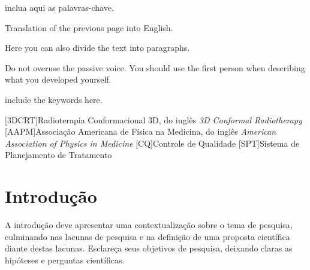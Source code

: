 \documentclass[a4paper, 12pt]{ppgeb}
\begin{document}
inclua aqui as palavras-chave.
\acresetall %
\clearpage
\restoregeometry
\acresetall %
\vspace{24pt}

Translation of the previous page into English.

Here you can also divide the text into paragraphs.

Do not overuse the passive voice. You should use the first person when describing what you developed yourself.

\vspace{14pt}

include the keywords here.
\acresetall %

\indice

\begin{center}

{\bfseries{} }%
\end{center}

[3DCRT]{Radioterapia Conformacional 3D, do inglês \emph{3D Conformal Radiotherapy}}
[AAPM]{Associação Americana de Física na Medicina, do inglês \emph{American Association of Physics in Medicine}}
[CQ]{Controle de Qualidade}
[SPT]{Sistema de Planejamento de Tratamento}

\begin{acronym}
\end{acronym}

\clearpage


\acresetall %

\chapter{Introdução}

A introdução deve apresentar uma contextualização sobre o tema de pesquisa, culminando nas lacunas de pesquisa e na definição de uma proposta científica diante destas lacunas. Esclareça seus objetivos de pesquisa, deixando claras as hipóteses e perguntas científicas.
\end{document}
